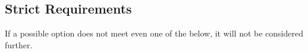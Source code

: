
\subsection{Strict Requirements}
If a possible option does not meet even one of the below, it will not be considered further.

